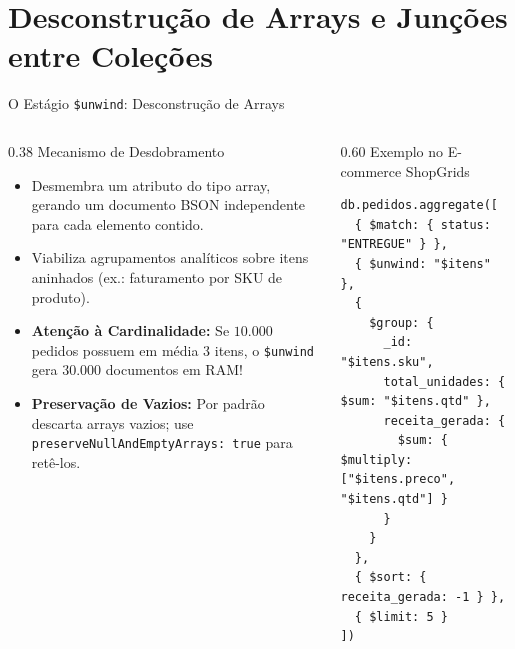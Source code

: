 \section[Desconstrução e Junção: unwind e lookup]{Desconstrução de Arrays e Junções entre Coleções}

\begin{frame}[fragile]{O Estágio \texttt{\$unwind}: Desconstrução de Arrays}
  \vspace{0.1cm}
  \begin{columns}[t,onlytextwidth]
    \begin{column}{0.38\textwidth}
      \alert{Mecanismo de Desdobramento}\par
      \footnotesize
      \begin{itemize}
        \item Desmembra um atributo do tipo array, gerando um documento BSON independente para cada elemento contido.
        \item Viabiliza agrupamentos analíticos sobre itens aninhados (ex.: faturamento por SKU de produto).
        \item \textbf{Atenção à Cardinalidade:} Se $10.000$ pedidos possuem em média 3 itens, o \lstinline[language=mongosh, basicstyle=\footnotesize\ttfamily]|$unwind| gera $30.000$ documentos em RAM!
        \item \textbf{Preservação de Vazios:} Por padrão descarta arrays vazios; use \lstinline[language=mongosh, basicstyle=\scriptsize\ttfamily]|preserveNullAndEmptyArrays: true| para retê-los.
      \end{itemize}
    \end{column}
    \begin{column}{0.60\textwidth}
      \alert{Exemplo no E-commerce ShopGrids}\par
      \vspace{0.05cm}
      \begin{lstlisting}[language=mongosh, basicstyle=\fontsize{6.5pt}{7.2pt}\ttfamily]
db.pedidos.aggregate([
  { $match: { status: "ENTREGUE" } },
  { $unwind: "$itens" },
  {
    $group: {
      _id: "$itens.sku",
      total_unidades: { $sum: "$itens.qtd" },
      receita_gerada: {
        $sum: { $multiply: ["$itens.preco", "$itens.qtd"] }
      }
    }
  },
  { $sort: { receita_gerada: -1 } },
  { $limit: 5 }
])
      \end{lstlisting}
    \end{column}
  \end{columns}
\end{frame}

